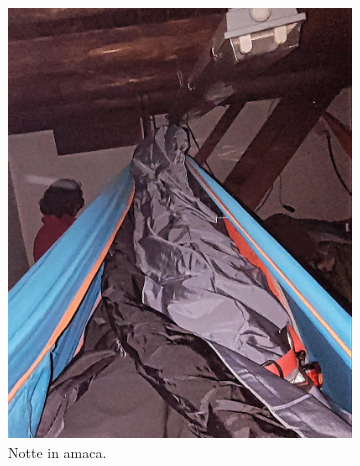 \documentclass{article}
\begin{document}
\begin{figure}[H]
    \centering
    \begin{subfigure}[b]{0.45\textwidth}
        \includegraphics[width=\textwidth]{images/foto_amaca.jpg}
        \caption{Notte in amaca.}
    \end{subfigure}
    \hfill
    \begin{subfigure}[b]{0.45\textwidth}

\end{subfigure}
\end{figure}
\end{document}
